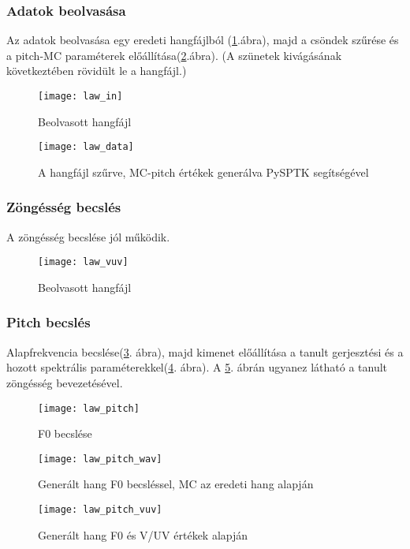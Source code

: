 \subsubsection{Adatok beolvasása}
Az adatok beolvasása egy eredeti hangfájlból (\ref{law-1}.ábra), majd a csöndek szűrése és a pitch-MC paraméterek előállítása(\ref{law-2}.ábra). (A szünetek kivágásának következtében rövidült le a hangfájl.)
\begin{figure}[h]
	
	\par\centering	
	\texttt{[image: law\_in]}
	\caption{Beolvasott hangfájl}
	\label{law-1}
\end{figure}
\begin{figure}[h]
	\par\centering	
	\texttt{[image: law\_data]}
	\caption{A hangfájl szűrve, MC-pitch értékek generálva PySPTK segítségével}
	\label{law-2}
\end{figure}
\subsubsection{Zöngésség becslés}
A zöngésség becslése jól működik.
\begin{figure}[h]
	
	\par\centering	
	\texttt{[image: law\_vuv]}
	\caption{Beolvasott hangfájl}
\end{figure}
\subsubsection{Pitch becslés}
Alapfrekvencia becslése(\ref{law-3}. ábra), majd kimenet előállítása a tanult gerjesztési és a hozott spektrális paraméterekkel(\ref{law-4}. ábra). A \ref{law-5}. ábrán ugyanez látható a tanult zöngésség bevezetésével.
\begin{figure}[h]
	\par\centering	
	\texttt{[image: law\_pitch]}
	\caption{F0 becslése}
		\label{law-3}
\end{figure}
\begin{figure}[h]
	\par\centering	
	\texttt{[image: law\_pitch\_wav]}
	\caption{Generált hang F0 becsléssel, MC az eredeti hang alapján}
		\label{law-4}
\end{figure}
\begin{figure}[h]
	\par\centering	
	\texttt{[image: law\_pitch\_vuv]}
	\caption{Generált hang F0 és V/UV értékek alapján}
		\label{law-5}
\end{figure}

